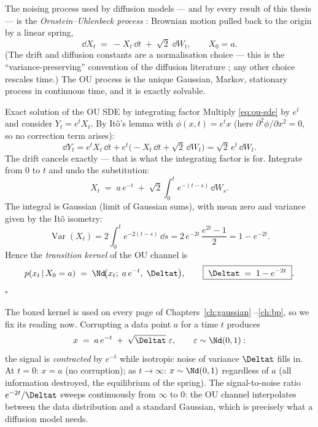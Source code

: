 The noising process used by diffusion models --- and by every result of this
thesis --- is the \emph{Ornstein--Uhlenbeck process}
\citep{uhlenbeck1930theory}: Brownian motion pulled back to the origin by a
linear spring,
\begin{equation}
  \dd X_t \;=\; -X_t\,\dd t \;+\; \sqrt{2}\;\dd W_t ,
  \qquad X_0 = a .
  \label{eq:ou-sde}
\end{equation}
(The drift and diffusion constants are a normalisation choice --- this is
the ``variance-preserving'' convention of the diffusion literature
\citep{song2021scorebased}; any other choice rescales time.) The OU process
is the unique Gaussian, Markov, stationary process in continuous time, and
it is exactly solvable.

\begin{toolbox}{Exact solution of the OU SDE by integrating factor}
Multiply \eqref{eq:ou-sde} by $e^{t}$ and consider
$Y_t = e^{t} X_t$. By It\^o's lemma with $\phi(x,t) = e^{t}x$ (here
$\partial^2 \phi/\partial x^2 = 0$, so no correction term arises):
\begin{equation*}
  \dd Y_t
  = e^{t} X_t\,\dd t + e^{t}\big( -X_t\,\dd t + \sqrt{2}\,\dd W_t \big)
  = \sqrt{2}\, e^{t}\, \dd W_t .
\end{equation*}
The drift cancels exactly --- that is what the integrating factor is for.
Integrate from $0$ to $t$ and undo the substitution:
\begin{equation*}
  X_t \;=\; a\, e^{-t} \;+\; \sqrt{2} \int_0^t e^{-(t-s)}\, \dd W_s .
\end{equation*}
The integral is Gaussian (limit of Gaussian sums), with mean zero and
variance given by the It\^o isometry:
\begin{equation*}
  \operatorname{Var}(X_t)
  = 2 \int_0^t e^{-2(t-s)}\, \dd s
  = 2\, e^{-2t}\, \frac{e^{2t} - 1}{2}
  = 1 - e^{-2t} .
\end{equation*}
Hence the \emph{transition kernel} of the OU channel is
\begin{equation*}
  p(x_t \,|\, X_0 = a)
  \;=\; \Nd\!\big( x_t;\; a\,e^{-t},\; \Deltat \big),
  \qquad
  \boxed{\;\Deltat \;=\; 1 - e^{-2t}\;} .
\end{equation*}
\hfill$\square$
\end{toolbox}

The boxed kernel is used on every page of Chapters~\ref{ch:gaussian}
--\ref{ch:bp}, so we fix its reading now. Corrupting a data point $a$ for a
time $t$ produces
\begin{equation}
  x \;=\; a\, e^{-t} \;+\; \sqrt{\Deltat}\;\varepsilon,
  \qquad \varepsilon \sim \Nd(0, 1):
  \label{eq:ou-channel}
\end{equation}
the signal is \emph{contracted} by $e^{-t}$ while isotropic noise of
variance $\Deltat$ fills in. At $t = 0$: $x = a$ (no corruption); as
$t \to \infty$: $x \sim \Nd(0, 1)$ regardless of $a$ (all information
destroyed, the equilibrium of the spring). The signal-to-noise ratio
$e^{-2t}/\Deltat$ sweeps continuously from $\infty$ to $0$: the OU channel
interpolates between the data distribution and a standard Gaussian, which is
precisely what a diffusion model needs.

